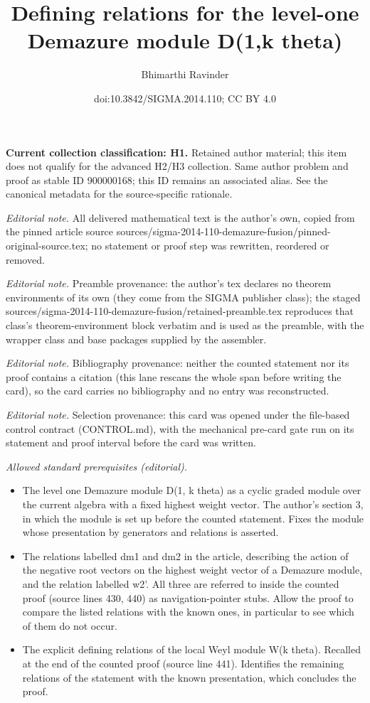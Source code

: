 \documentclass[10pt,a4paper]{amsart}
\title{Defining relations for the level-one Demazure module D(1,k theta)}
\author{Bhimarthi Ravinder}
\date{doi:10.3842/SIGMA.2014.110; CC BY 4.0}
\begin{document}
\maketitle
\par\medskip\noindent\textbf{Current collection classification: H1.} Retained author material; this item does not qualify for the advanced H2/H3 collection. Same author problem and proof as stable ID 900000168; this ID remains an associated alias. See the canonical metadata for the source-specific rationale.\par\medskip

\noindent\textit{Editorial note.} All delivered mathematical text is the author's own, copied from the pinned article source sources/sigma-2014-110-demazure-fusion/pinned-original-source.tex; no statement or proof step was rewritten, reordered or removed.\par\medskip
\noindent\textit{Editorial note.} Preamble provenance: the author's tex declares no theorem environments of its own (they come from the SIGMA publisher class); the staged sources/sigma-2014-110-demazure-fusion/retained-preamble.tex reproduces that class's theorem-environment block verbatim and is used as the preamble, with the wrapper class and base packages supplied by the assembler.\par\medskip
\noindent\textit{Editorial note.} Bibliography provenance: neither the counted statement nor its proof contains a citation (this lane rescans the whole span before writing the card), so the card carries no bibliography and no entry was reconstructed.\par\medskip
\noindent\textit{Editorial note.} Selection provenance: this card was opened under the file-based control contract (CONTROL.md), with the mechanical pre-card gate run on its statement and proof interval before the card was written.\par\medskip
\noindent\textit{Allowed standard prerequisites (editorial).}\begin{itemize}
\item The level one Demazure module D(1, k theta) as a cyclic graded module over the current algebra with a fixed highest weight vector. The author's section 3, in which the module is set up before the counted statement. Fixes the module whose presentation by generators and relations is asserted.
\item The relations labelled dm1 and dm2 in the article, describing the action of the negative root vectors on the highest weight vector of a Demazure module, and the relation labelled w2'. All three are referred to inside the counted proof (source lines 430, 440) as navigation-pointer stubs. Allow the proof to compare the listed relations with the known ones, in particular to see which of them do not occur.
\item The explicit defining relations of the local Weyl module W(k theta). Recalled at the end of the counted proof (source line 441). Identifies the remaining relations of the statement with the known presentation, which concludes the proof.
\end{itemize}\medskip
\end{document}
